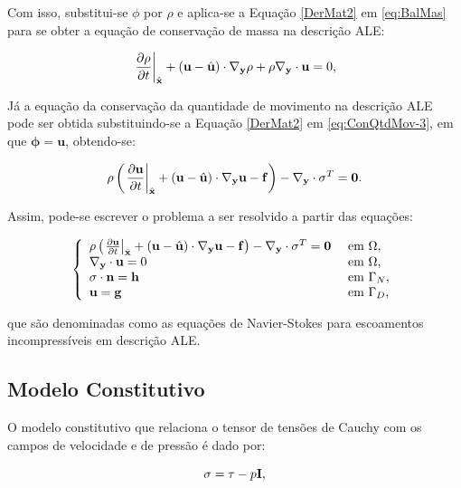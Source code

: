 \documentclass[_ArquivoPrincipal.tex]{subfiles}
\begin{document}
Com isso, substitui-se $\phi$ por $\rho$ e aplica-se a Equação \ref{DerMat2} em \ref{eq:BalMas} para se obter a equação de conservação de massa na descrição ALE:

\begin{equation}
    \left.\frac{\partial{\rho}}{\partial{t}}\right|_{\hat{\mathbf{x}}}+(\mathbf{u}-\hat{\mathbf{u}})\cdot\mathbf{\nabla_y}\rho+\rho\mathbf{\nabla_y}\cdot\mathbf{u}=0\text{,}
    \label{ConMas4}
\end{equation}

Já a equação da conservação da quantidade de movimento na descrição ALE pode ser obtida substituindo-se a Equação \ref{DerMat2} em \ref{eq:ConQtdMov-3}, em que $\mathbf{\phi}=\mathbf{u}$, obtendo-se:

\begin{equation}
    \rho\left(\left.\frac{\partial{\mathbf{u}}}{\partial{t}}\right|_{\hat{\mathbf{x}}}+(\mathbf{u}-\hat{\mathbf{u}})\cdot\mathbf{\nabla_y}\mathbf{u}-\mathbf{f}\right)-\mathbf{\nabla_y}\cdot\mathbf{\sigma}^T=\mathbf{0}\text{.}
    \label{ConQtdMov10}
\end{equation}

Assim, pode-se escrever o problema a ser resolvido a partir das equações:

\begin{equation}
    \left\{
   \begin{array}{ll}
        \rho\left(\left.\frac{\partial{\mathbf{u}}}{\partial{t}}\right|_{\hat{\mathbf{x}}}+(\mathbf{u}-\hat{\mathbf{u}})\cdot\mathbf{\nabla_y}\mathbf{u}-\mathbf{f}\right)-\mathbf{\nabla_y}\cdot\mathbf{\sigma}^T=\mathbf{0}&\text{ em }\Omega\text{,}\\
        \mathbf{\nabla_y}\cdot\mathbf{u}=0&\text{ em }\Omega\text{,}\\
        \mathbf{\sigma}\cdot\mathbf{n}=\mathbf{h}&\text{ em }\Gamma_N\text{,}\\
        \mathbf{u}=\mathbf{g}&\text{ em }\Gamma_D\text{,}
    \end{array}
    \right.\label{eq:NS-ALE}
\end{equation}

\noindent que são denominadas como as equações de Navier-Stokes para escoamentos incompressíveis em descrição ALE.

\subsection{Modelo Constitutivo} \label{MC}

O modelo constitutivo que relaciona o tensor de tensões de Cauchy com os campos de velocidade e de pressão é dado por:

\begin{equation}
    \mathbf{\sigma}=\mathbf{\tau}-p\mathbf{I}\text{,}\label{eq:const1}
\end{equation}
\end{document}
